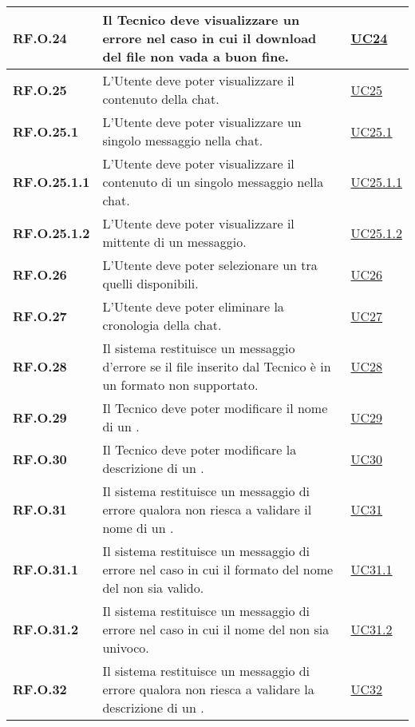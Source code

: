 \begin{longtable}{|P{3cm}|P{6,5cm}|>{\arraybackslash}P{4cm}|}
    \hline
    \textbf{RF.O.24} & Il Tecnico deve visualizzare un errore nel caso in cui il download del file non vada a buon fine. &  \hyperref[UC24]{UC24}\\
    \hline
    \textbf{RF.O.25} & L'Utente deve poter visualizzare il contenuto della chat. &  \hyperref[UC25]{UC25}\\
    \hline
    \textbf{RF.O.25.1} & L'Utente deve poter visualizzare un singolo messaggio nella chat. &  \hyperref[UC25point1]{UC25.1}\\
    \hline
    \textbf{RF.O.25.1.1} & L'Utente deve poter visualizzare il contenuto di un singolo messaggio nella chat. &  \hyperref[UC25point1point1]{UC25.1.1}\\
    \hline
    \textbf{RF.O.25.1.2} & L'Utente deve poter visualizzare il mittente di un messaggio. &  \hyperref[UC25poin1point2]{UC25.1.2}\\
    \hline
    \textbf{RF.O.26} & L'Utente deve poter selezionare un  tra quelli disponibili. & \hyperref[UC26]{UC26} \\
    \hline
    \textbf{RF.O.27} & L'Utente deve poter eliminare la cronologia della chat. & \hyperref[UC27]{UC27} \\
    \hline
    \textbf{RF.O.28} & Il sistema restituisce un messaggio d'errore se il file inserito dal Tecnico è in un formato non supportato. & \hyperref[UC28]{UC28} \\
    \hline
    \textbf{RF.O.29} & Il Tecnico deve poter modificare il nome di un . & \hyperref[UC29]{UC29} \\
    \hline
    \textbf{RF.O.30} & Il Tecnico deve poter modificare la descrizione di un . & \hyperref[UC30]{UC30} \\
    \hline
    \textbf{RF.O.31} & Il sistema restituisce un messaggio di errore qualora non riesca a validare il nome di un . & \hyperref[UC31]{UC31} \\
    \hline
    \textbf{RF.O.31.1} & Il sistema restituisce un messaggio di errore nel caso in cui il formato del nome del  non sia valido. & \hyperref[UC31point1]{UC31.1} \\
    \hline
    \textbf{RF.O.31.2} & Il sistema restituisce un messaggio di errore nel caso in cui il nome del  non sia univoco. & \hyperref[UC31point2]{UC31.2} \\
    \hline
    \textbf{RF.O.32} & Il sistema restituisce un messaggio di errore qualora non riesca a validare la descrizione di un . & \hyperref[UC32]{UC32} \\

\end{longtable}
